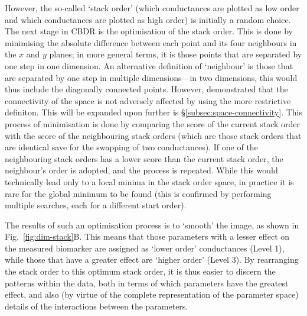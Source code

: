 \documentclass[../thesis-main.tex]{subfiles}
\begin{document}
However, the so-called `stack order' (which conductances are plotted as low order and which conductances are plotted as high order) is initially a random choice. The next stage in CBDR is the optimisation of the stack order. This is done by minimising the absolute difference between each point and its four neighbours in the $x$ and $y$ planes; in more general terms, it is those points that are separated by one step in one dimension. An alternative definition of `neighbour' is those that are separated by one step in multiple dimensions---in two dimensions, this would thus include the diagonally connected points. However, \citet{Taylor2006} demonstrated that the connectivity of the space is not adversely affected by using the more restrictive definiton. This will be expanded upon further is \S\ref{subsec:space-connectivity}.
% 
This process of minimisation is done by comparing the score of the current stack order with the score of the neighbouring stack orders (which are those stack orders that are identical save for the swapping of two conductances). If one of the neighbouring stack orders has a lower score than the current stack order, the neighbour's order is adopted, and the process is repeated. While this would technically lead only to a local minima in the stack order space, in practice it is rare for the global minimum to be found (this is confirmed by performing multiple searches, each for a different start order).

The results of such an optimisation process is to `smooth' the image, as shown in Fig.~\ref{fig:dim-stack}B. This means that those parameters with a lesser effect on the measured biomarker are assigned as `lower order' conductances (Level 1), while those that have a greater effect are `higher order' (Level 3). By rearranging the stack order to this optimum stack order, it is thus easier to discern the patterns within the data, both in terms of which parameters have the greatest effect, and also (by virtue of the complete representation of the parameter space) details of the interactions between the parameters.
\end{document}
